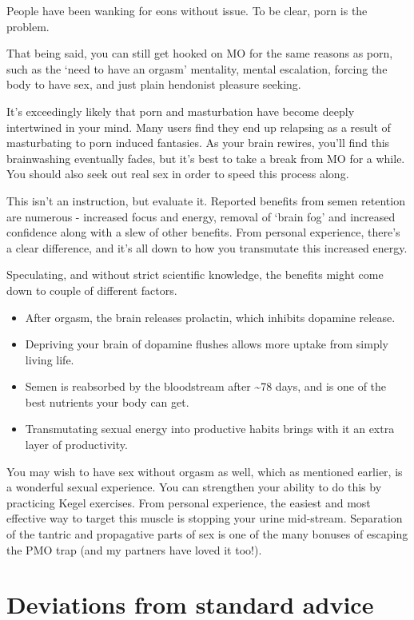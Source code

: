 \documentclass[
]{book}
\begin{document}
People have been wanking for eons without issue. To be clear, porn is the problem.

That being said, you can still get hooked on MO for the same reasons as porn, such as the `need to have an orgasm' mentality, mental escalation, forcing the body to have sex, and just plain hendonist pleasure seeking.

It's exceedingly likely that porn and masturbation have become deeply intertwined in your mind. Many users find they end up relapsing as a result of masturbating to porn induced fantasies. As your brain rewires, you'll find this brainwashing eventually fades, but it's best to take a break from MO for a while. You should also seek out real sex in order to speed this process along.

This isn't an instruction, but evaluate it. Reported benefits from semen retention are numerous - increased focus and energy, removal of `brain fog' and increased confidence along with a slew of other benefits. From personal experience, there's a clear difference, and it's all down to how you transmutate this increased energy.

Speculating, and without strict scientific knowledge, the benefits might come down to couple of different factors.

\begin{itemize}
\item
  After orgasm, the brain releases prolactin, which inhibits dopamine release.
\item
  Depriving your brain of dopamine flushes allows more uptake from simply living life.
\item
  Semen is reabsorbed by the bloodstream after \textasciitilde78 days, and is one of the best nutrients your body can get.
\item
  Transmutating sexual energy into productive habits brings with it an extra layer of productivity.
\end{itemize}

You may wish to have sex without orgasm as well, which as mentioned earlier, is a wonderful sexual experience. You can strengthen your ability to do this by practicing Kegel exercises. From personal experience, the easiest and most effective way to target this muscle is stopping your urine mid-stream. Separation of the tantric and propagative parts of sex is one of the many bonuses of escaping the PMO trap (and my partners have loved it too!).

\hypertarget{deviations-from-standard-advice}{%
\section{Deviations from standard advice}\label{deviations-from-standard-advice}}
\end{document}

